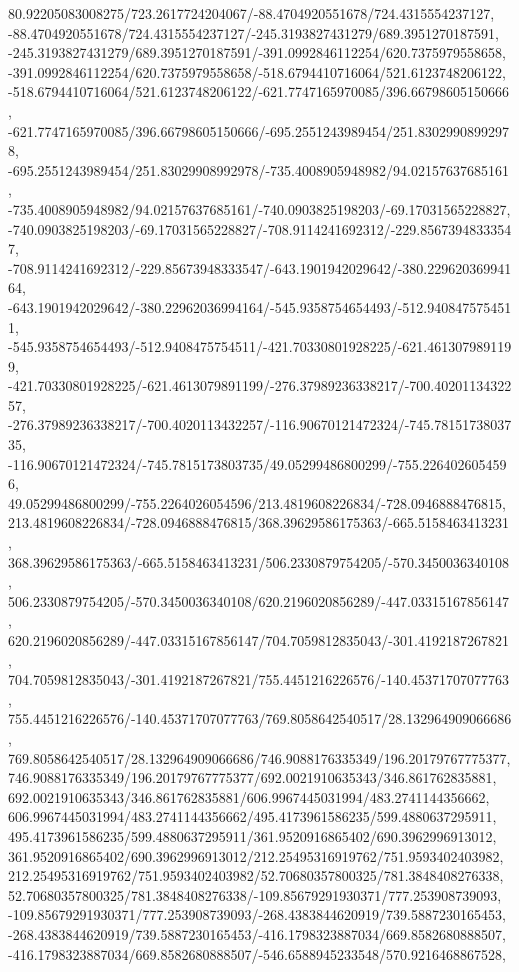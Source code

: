 {    80.92205083008275/723.2617724204067/-88.4704920551678/724.4315554237127,
    -88.4704920551678/724.4315554237127/-245.3193827431279/689.3951270187591,
    -245.3193827431279/689.3951270187591/-391.0992846112254/620.7375979558658,
    -391.0992846112254/620.7375979558658/-518.6794410716064/521.6123748206122,
    -518.6794410716064/521.6123748206122/-621.7747165970085/396.66798605150666,
    -621.7747165970085/396.66798605150666/-695.2551243989454/251.83029908992978,
    -695.2551243989454/251.83029908992978/-735.4008905948982/94.02157637685161,
    -735.4008905948982/94.02157637685161/-740.0903825198203/-69.17031565228827,
    -740.0903825198203/-69.17031565228827/-708.9114241692312/-229.85673948333547,
    -708.9114241692312/-229.85673948333547/-643.1901942029642/-380.22962036994164,
    -643.1901942029642/-380.22962036994164/-545.9358754654493/-512.9408475754511,
    -545.9358754654493/-512.9408475754511/-421.70330801928225/-621.4613079891199,
    -421.70330801928225/-621.4613079891199/-276.37989236338217/-700.4020113432257,
    -276.37989236338217/-700.4020113432257/-116.90670121472324/-745.7815173803735,
    -116.90670121472324/-745.7815173803735/49.05299486800299/-755.2264026054596,
    49.05299486800299/-755.2264026054596/213.4819608226834/-728.0946888476815,
    213.4819608226834/-728.0946888476815/368.39629586175363/-665.5158463413231,
    368.39629586175363/-665.5158463413231/506.2330879754205/-570.3450036340108,
    506.2330879754205/-570.3450036340108/620.2196020856289/-447.03315167856147,
    620.2196020856289/-447.03315167856147/704.7059812835043/-301.4192187267821,
    704.7059812835043/-301.4192187267821/755.4451216226576/-140.45371707077763,
    755.4451216226576/-140.45371707077763/769.8058642540517/28.132964909066686,
    769.8058642540517/28.132964909066686/746.9088176335349/196.20179767775377,
    746.9088176335349/196.20179767775377/692.0021910635343/346.861762835881,
    692.0021910635343/346.861762835881/606.9967445031994/483.2741144356662,
    606.9967445031994/483.2741144356662/495.4173961586235/599.4880637295911,
    495.4173961586235/599.4880637295911/361.9520916865402/690.3962996913012,
    361.9520916865402/690.3962996913012/212.25495316919762/751.9593402403982,
    212.25495316919762/751.9593402403982/52.70680357800325/781.3848408276338,
    52.70680357800325/781.3848408276338/-109.85679291930371/777.253908739093,
    -109.85679291930371/777.253908739093/-268.4383844620919/739.5887230165453,
    -268.4383844620919/739.5887230165453/-416.1798323887034/669.8582680888507,
    -416.1798323887034/669.8582680888507/-546.6588945233548/570.9216468867528,
}

